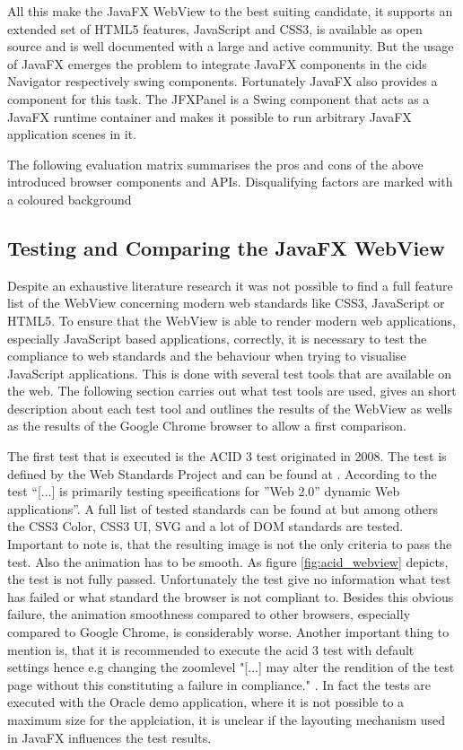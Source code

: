 All this make the JavaFX WebView to the best suiting candidate, it supports an extended set of HTML5 features, JavaScript and CSS3, is available as open source and is well documented with a large and active community.
But the usage of JavaFX emerges the problem to integrate JavaFX components in the cids Navigator respectively swing components.
Fortunately JavaFX also provides a component for this task.
The JFXPanel is a Swing component that acts as a JavaFX runtime container and makes it possible to run arbitrary JavaFX application scenes in it.
 

The following evaluation matrix summarises the pros and cons of the above introduced browser components and APIs. Disqualifying factors are marked with a coloured background



\subsection{Testing and Comparing the JavaFX WebView}\label{chap:browser_api_testing}

Despite an exhaustive literature research it was not possible to find a full feature list of the WebView concerning modern web standards like CSS3, JavaScript or HTML5.
To ensure that the WebView is able to render modern web applications, especially JavaScript based applications, correctly, it is necessary to test the compliance to web standards and the behaviour when trying to visualise JavaScript applications.
This is done with several test tools that are available on the web.
The following section carries out what test tools are used, gives an short description about each test tool and outlines the results of the WebView as wells as the results of the Google Chrome browser to allow a first comparison.

The first test that is executed is the ACID 3 test originated in 2008.
The test is defined by the Web Standards Project and can be found at \autocite{tech-ana:acid3}.
According to \autocite{tech-ana:acid3} the test \enquote{[...] is primarily testing specifications for ''Web 2.0'' dynamic Web applications}. A full list of tested standards can be found at \autocite{tech-ana:acid3} but among others the CSS3 Color, CSS3 UI, SVG and a lot of DOM standards are tested.
Important to note is, that the resulting image is not the only criteria to pass the test.
Also the animation has to be smooth.
As figure \ref{fig:acid_webview} depicts, the test is not fully passed.
Unfortunately the test give no information what test has failed or what standard the browser is not compliant to.
Besides this obvious failure, the animation smoothness compared to other browsers, especially compared to Google Chrome, is considerably worse.
Another important thing to mention is, that it is recommended to execute the acid 3 test with default settings hence e.g changing the zoomlevel "[...] may alter the rendition of the test page without this constituting a failure in compliance." \autocite{tech-ana:acid3}.
In fact the tests are executed with the Oracle demo application, where it is not possible to a maximum size for the applciation, it is unclear if the layouting mechanism used in JavaFX influences the test results.

